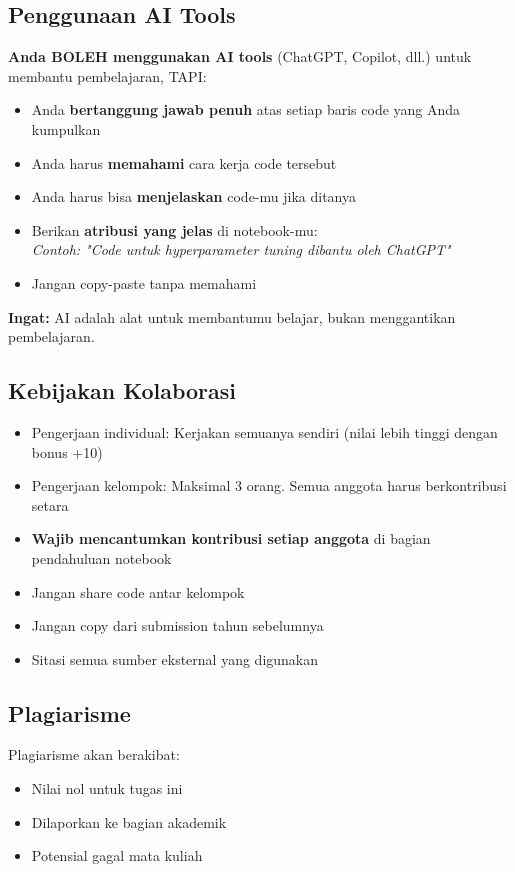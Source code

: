 \documentclass[12pt,a4paper]{article}
\begin{document}
\subsection{Penggunaan AI Tools}
\begin{tcolorbox}[colback=yellow!10!white,colframe=orange!75!black,title=Kebijakan Penggunaan AI]
\textbf{Anda BOLEH menggunakan AI tools} (ChatGPT, Copilot, dll.) untuk membantu pembelajaran, TAPI:

\begin{itemize}
    \item Anda \textbf{bertanggung jawab penuh} atas setiap baris code yang Anda kumpulkan
    \item Anda harus \textbf{memahami} cara kerja code tersebut
    \item Anda harus bisa \textbf{menjelaskan} code-mu jika ditanya
    \item Berikan \textbf{atribusi yang jelas} di notebook-mu: \\
    \textit{Contoh: "Code untuk hyperparameter tuning dibantu oleh ChatGPT"}
    \item Jangan copy-paste tanpa memahami
\end{itemize}

\textbf{Ingat:} AI adalah alat untuk membantumu belajar, bukan menggantikan pembelajaran.
\end{tcolorbox}

\subsection{Kebijakan Kolaborasi}
\begin{itemize}
    \item Pengerjaan individual: Kerjakan semuanya sendiri (nilai lebih tinggi dengan bonus +10)
    \item Pengerjaan kelompok: Maksimal 3 orang. Semua anggota harus berkontribusi setara
    \item \textbf{Wajib mencantumkan kontribusi setiap anggota} di bagian pendahuluan notebook
    \item Jangan share code antar kelompok
    \item Jangan copy dari submission tahun sebelumnya
    \item Sitasi semua sumber eksternal yang digunakan
\end{itemize}

\subsection{Plagiarisme}
Plagiarisme akan berakibat:
\begin{itemize}
    \item Nilai nol untuk tugas ini
    \item Dilaporkan ke bagian akademik
    \item Potensial gagal mata kuliah
\end{itemize}
\end{document}
